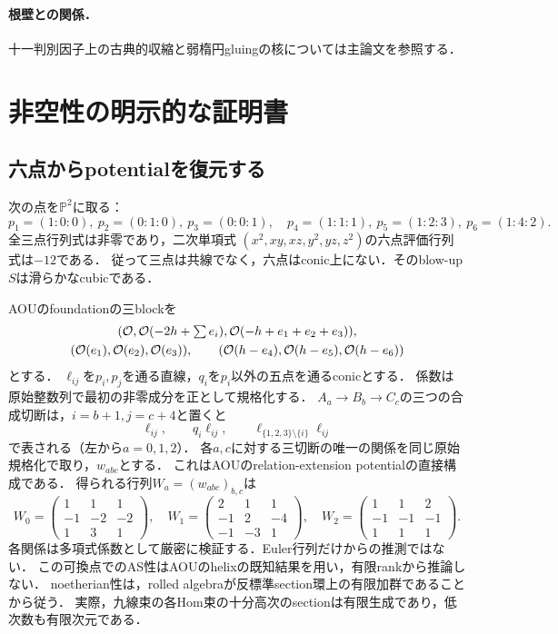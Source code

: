 \paragraph{根壁との関係．}十一判別因子上の古典的収縮と弱楕円gluingの核については主論文\cite{Hearts}を参照する．
\section{非空性の明示的な証明書}
\subsection{六点からpotentialを復元する}
次の点を$\mathbb P^2$に取る：
\[
 p_1=(1:0:0),\ p_2=(0:1:0),\ p_3=(0:0:1),\quad
 p_4=(1:1:1),\ p_5=(1:2:3),\ p_6=(1:4:2).
\]
全三点行列式は非零であり，二次単項式
$(x^2,xy,xz,y^2,yz,z^2)$の六点評価行列式は$-12$である．
従って三点は共線でなく，六点はconic上にない．そのblow-up $S$は滑らかなcubicである．

AOUのfoundationの三blockを
\[
 \begin{gathered}
 (\mathcal O,\mathcal O(-2h+\textstyle\sum e_i),\mathcal O(-h+e_1+e_2+e_3)),\\
 (\mathcal O(e_1),\mathcal O(e_2),\mathcal O(e_3)),\qquad
 (\mathcal O(h-e_4),\mathcal O(h-e_5),\mathcal O(h-e_6))
 \end{gathered}
\]
とする\cite[(4.1)]{AOU}．
$\ell_{ij}$を$p_i,p_j$を通る直線，$q_i$を$p_i$以外の五点を通るconicとする．
係数は原始整数列で最初の非零成分を正として規格化する．
$A_a\to B_b\to C_c$の三つの合成切断は，$i=b+1,j=c+4$と置くと
\[
 \ell_{ij},\qquad q_i\ell_{ij},\qquad
 \ell_{\{1,2,3\}\setminus\{i\}}\ell_{ij}
\]
で表される（左から$a=0,1,2$）．
各$a,c$に対する三切断の唯一の関係を同じ原始規格化で取り，$w_{abc}$とする．
これはAOUのrelation-extension potentialの直接構成\cite[(4.7)]{AOU}である．
得られる行列$W_a=(w_{abc})_{b,c}$は
\begin{equation}\label{eq:witness}
 W_0=\begin{pmatrix}1&1&1\\-1&-2&-2\\1&3&1\end{pmatrix},\quad
 W_1=\begin{pmatrix}2&1&1\\-1&2&-4\\-1&-3&1\end{pmatrix},\quad
 W_2=\begin{pmatrix}1&1&2\\-1&-1&-1\\1&1&1\end{pmatrix}.
\end{equation}
各関係は多項式係数として厳密に検証する．Euler行列だけからの推測ではない．
この可換点でのAS性はAOUのhelixの既知結果を用い，有限rankから推論しない．
noetherian性は，rolled algebraが反標準section環上の有限加群であることから従う．
実際，九線束の各Hom束の十分高次のsectionは有限生成であり，低次数も有限次元である．

